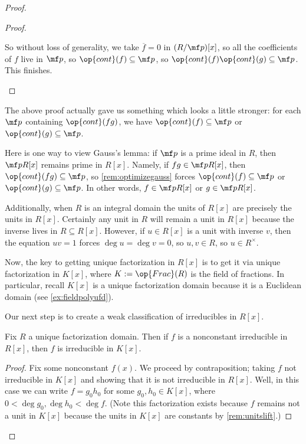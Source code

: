 \begin{proof}
\begin{proof}
\begin{itemize}
			So without loss of generality, we take $\overline f=0$ in $(R/\mf p)[x]$, so all the coefficients of $f$ live in $\mf p$, so $\op{cont}(f)\subseteq\mf p$, so $\op{cont}(f)\op{cont}(g)\subseteq\mf p$. This finishes.
			\qedhere
		\end{itemize}
	\end{proof}
	\begin{remark}[Nir] \label{rem:optimizegauss}
		The above proof actually gave us something which looks a little stronger: for each $\mf p$ containing $\op{cont}(fg)$, we have $\op{cont}(f)\subseteq\mf p$ or $\op{cont}(g)\subseteq\mf p$.
	\end{remark}
	\begin{remark}[Nir] \label{rem:primeslift}
		Here is one way to view Gauss's lemma: if $\mf p$ is a prime ideal in $R$, then $\mf pR[x]$ remains prime in $R[x]$. Namely, if $fg\in\mf pR[x]$, then $\op{cont}(fg)\subseteq\mf p$, so \autoref{rem:optimizegauss} forces $\op{cont}(f)\subseteq\mf p$ or $\op{cont}(g)\subseteq\mf p$. In other words, $f\in\mf pR[x]$ or $g\in\mf pR[x]$.
	\end{remark}
	\begin{remark}[Nir] \label{rem:unitslift}
		Additionally, when $R$ is an integral domain the units of $R[x]$ are precisely the units in $R[x]$. Certainly any unit in $R$ will remain a unit in $R[x]$ because the inverse lives in $R\subseteq R[x]$. However, if $u\in R[x]$ is a unit with inverse $v$, then the equation $uv=1$ forces $\deg u=\deg v=0$, so $u,v\in R$, so $u\in R^\times$.
	\end{remark}
	Now, the key to getting unique factorization in $R[x]$ is to get it via unique factorization in $K[x]$, where $K:=\op{Frac}(R)$ is the field of fractions. In particular, recall $K[x]$ is a unique factorization domain because it is a Euclidean domain (see \autoref{ex:fieldpolyufd}).

	Our next step is to create a weak classification of irreducibles in $R[x]$.
	\begin{lemma} \label{lem:irredfracfield}
		Fix $R$ a unique factorization domain. Then if $f$ is a nonconstant irreducible in $R[x]$, then $f$ is irreducible in $K[x]$.
	\end{lemma}
	\begin{proof}
		Fix some nonconstant $f(x)$. We proceed by contraposition; taking $f$ not irreducible in $K[x]$ and showing that it is not irreducible in $R[x]$. Well, in this case we can write $f=g_0h_0$ for some $g_0,h_0\in K[x]$, where $0<\deg g_0,\deg h_0<\deg f$. (Note this factorization exists because $f$ remains not a unit in $K[x]$ because the units in $K[x]$ are constants by \autoref{rem:unitslift}.)
		

\end{proof}
\end{proof}
